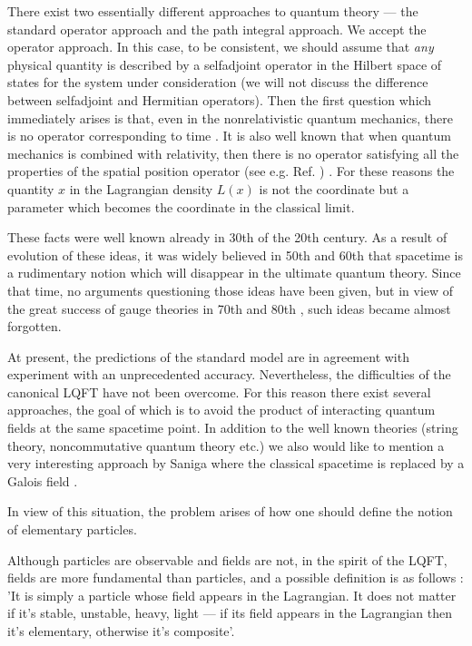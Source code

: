 \documentclass[a4paper,12pt]{article}%
\begin{document}
There exist two essentially different approaches to quantum 
theory --- the standard operator approach and the path 
integral approach. We accept the operator approach. In this 
case, to be consistent, we should assume that {\it any} 
physical quantity is described by a selfadjoint operator 
in the Hilbert space of states for the system under 
consideration (we will not discuss the difference between 
selfadjoint and Hermitian operators).
Then the first question which immediately arises is that, 
even in the nonrelativistic quantum mechanics, there is no 
operator corresponding to time \cite{time}. It is also 
well known that when quantum mechanics is combined with 
relativity, then there is no operator satisfying all the 
properties of the spatial position operator 
(see e.g. Ref. \cite{Schweber}) . For these reasons the 
quantity $x$ in the Lagrangian density $L(x)$ is not 
the coordinate but a parameter which becomes the 
coordinate in the classical limit.

These facts were well known already in 30th of the 20th 
century. As a result of evolution of these ideas, it 
was widely believed in 50th and 60th that spacetime is 
a rudimentary notion which will disappear in the 
ultimate quantum theory. Since that time, no arguments 
questioning those ideas have been given, but in view of 
the great success of gauge theories in 70th and 80th , 
such ideas became almost forgotten. 

At present, the predictions of the standard model are 
in agreement with experiment with an unprecedented 
accuracy. Nevertheless, the difficulties of the 
canonical LQFT have not been overcome. For this reason 
there exist several approaches, the goal of which is 
to avoid the product of interacting quantum fields at 
the same spacetime point. In addition to the well 
known theories (string theory, noncommutative quantum 
theory etc.) we also would like to mention a very 
interesting approach by Saniga where the classical 
spacetime is replaced by a Galois field \cite{Saniga}.

In view of this situation, the problem arises of how 
one should define the notion of elementary particles. 

Although particles are observable and fields are not, 
in the spirit of the LQFT, fields are more fundamental 
than particles, and a possible definition is as 
follows \cite{Wein1}: 'It is simply a particle whose
field appears in the Lagrangian. It does not matter if
it's stable, unstable, heavy, light --- if its field 
appears in the Lagrangian then it's elementary, 
otherwise it's composite'.
    
\end{document}
